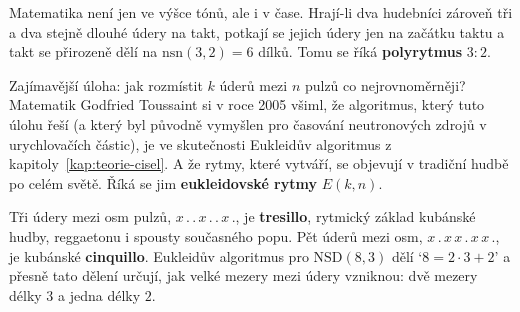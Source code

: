 Matematika není jen ve výšce tónů, ale i v čase. Hrají-li dva hudebníci zároveň tři a dva stejně dlouhé údery na takt, potkají se jejich údery jen na začátku taktu a takt se přirozeně dělí na $\mathrm{nsn}(3, 2) = 6$ dílků. Tomu se říká \textbf{polyrytmus} $3:2$.

\begin{center}
\end{center}

Zajímavější úloha: jak rozmístit $k$ úderů mezi $n$ pulzů co nejrovnoměrněji? Matematik Godfried Toussaint si v roce 2005 všiml, že algoritmus, který tuto úlohu řeší (a který byl původně vymyšlen pro časování neutronových zdrojů v urychlovačích částic), je ve skutečnosti Eukleidův algoritmus z kapitoly~\ref{kap:teorie-cisel}. A že rytmy, které vytváří, se objevují v tradiční hudbě po celém světě. Říká se jim \textbf{eukleidovské rytmy} $E(k, n)$.

\begin{center}
\end{center}

Tři údery mezi osm pulzů, $x\,.\,.\,x\,.\,.\,x\,.$, je \textbf{tresillo}, rytmický základ kubánské hudby, reggaetonu i spousty současného popu. Pět úderů mezi osm, $x\,.\,x\,x\,.\,x\,x\,.$, je kubánské \textbf{cinquillo}. Eukleidův algoritmus pro $\mathrm{NSD}(8, 3)$ dělí `$8 = 2\cdot 3 + 2$' a přesně tato dělení určují, jak velké mezery mezi údery vzniknou: dvě mezery délky $3$ a jedna délky $2$.

